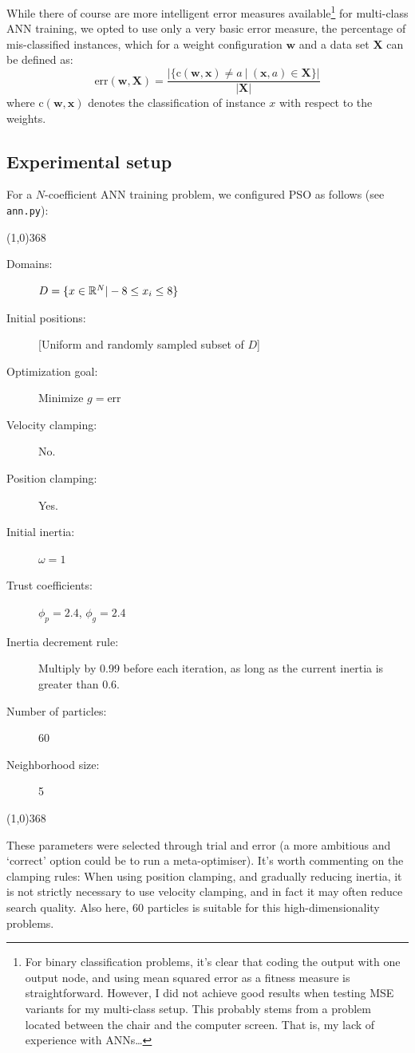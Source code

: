 \documentclass[a4paper,final,9pt]{article}
\begin{document}
While there of course are more intelligent error measures
available\footnote{For binary classification problems, it's clear that coding
the output with one output node, and using mean squared error as a fitness
measure is straightforward. However, I did not achieve good results when
testing MSE variants for my multi-class setup. This probably stems from a
problem located between the chair and the computer screen. That is, my lack of
experience with ANNs\ldots} for
multi-class ANN training, we opted to use only a very basic error measure, the
percentage of mis-classified instances, which for a weight configuration
$\mathbf{w}$ and a data set $\mathbf{X}$ can be defined as:
$$
\text{err}(\mathbf{w}, \mathbf{X}) = 
  \frac{ |\{ \text{c}(\mathbf{w}, \mathbf{x}) \neq a~|~(\mathbf{x}, a) \in
        \mathbf{X} \}| }
       {|\mathbf{X}|}
$$
where $\text{c}(\mathbf{w}, \mathbf{x})$ denotes the classification of
instance $x$ with respect to the weights.

\clearpage

\subsection{Experimental setup}
For a $N$-coefficient ANN training problem, we configured PSO as follows (see
\texttt{ann.py}):

\noindent
\line(1,0){368}
{\footnotesize
\begin{description}
  \item[Domains:] $D = \{ x \in \mathbb{R}^N | -8 \leq x_i \leq 8 \}$
  \item[Initial positions:] [Uniform and randomly sampled subset of $D$]
  \item[Optimization goal:] Minimize $g = \text{err}$ 
  \item[Velocity clamping:] No. 
  \item[Position clamping:] Yes.   
  \item[Initial inertia:] $\omega = 1$ 
  \item[Trust coefficients:] $\phi_p = 2.4$, $\phi_g = 2.4$
  \item[Inertia decrement rule:] Multiply by 0.99 before each iteration, as
    long as the current inertia is greater than $0.6$.
  \item[Number of particles:] 60
  \item[Neighborhood size:] 5
\end{description}
}
\noindent
\line(1,0){368}

\noindent
These parameters were selected through trial and error (a more ambitious and
`correct' option could be to run a meta-optimiser). It's worth commenting on
the clamping rules: When using position clamping, and gradually reducing
inertia, it is not strictly necessary to use velocity clamping, and in fact it
may often reduce search quality. Also here, 60 particles is suitable for this
high-dimensionality problems. 
\end{document}
